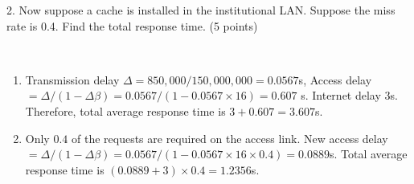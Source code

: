 \begin{exercise}[]
{    2. Now suppose a cache is installed in the institutional LAN. Suppose the miss rate is 0.4. Find the total response time. (5 points)}
  \begin{solution}
  \par{~}
  \begin{enumerate}
      \item Transmission delay $\Delta = 850,000 / 150,000,000 = 0.0567$s, Access delay $=\Delta /(1-\Delta \beta) = 0.0567 / (1 - 0.0567 \times 16) = 0.607$ s. Internet delay $3$s. Therefore, total average response time is $3 + 0.607 = 3.607$s.
      \item Only $0.4$ of the requests are required on the access link. New access delay $=\Delta /(1-\Delta \beta) = 0.0567 / (1 - 0.0567 \times 16 \times 0.4) = 0.0889$s. Total average response time is $(0.0889 + 3) \times 0.4 = 1.2356$s.
  \end{enumerate}
  \end{solution}
  \label{ex6}
\end{exercise}


